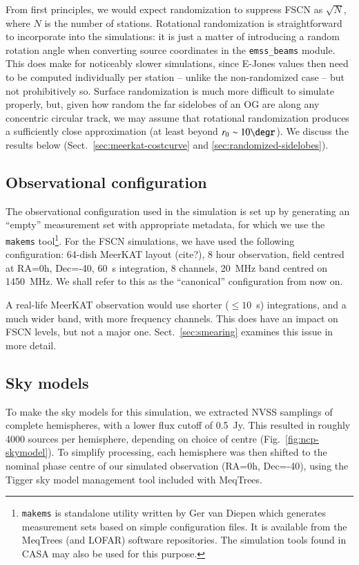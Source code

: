 \documentclass{aa}
\begin{document}
From first principles, we would expect randomization to suppress FSCN as $\sqrt{N}$, where $N$ is the number of stations. Rotational randomization is straightforward to incorporate into the simulations: it is just a matter of introducing a random rotation angle when converting source coordinates in the {\tt emss\_beams} module. This does make for noticeably slower simulations, since E-Jones values then need to be computed individually per station -- unlike the non-randomized case -- but not prohibitively so. Surface randomization is much more difficult to simulate properly, but, given how random the far sidelobes of an OG are along any concentric circular track, we may assume that rotational randomization produces a sufficiently close approximation (at least beyond $r_0\sim10\degr$). We discuss the results below (Sect.~\ref{sec:meerkat-costcurve} and \ref{sec:randomized-sidelobes}).

\subsection{Observational configuration}
\label{sec:config}

The observational configuration used in the simulation is set up by generating an ``empty'' measurement set with appropriate metadata, for which we use the {\tt makems} tool\footnote{{\tt makems} is standalone utility written by Ger van Diepen which generates measurement sets based on simple configuration files. It is available from the MeqTrees (and LOFAR) software repositories. The simulation tools found in CASA may also be used for this purpose.}. For the FSCN simulations, we have used the following configuration: 64-dish MeerKAT layout (cite?), 8 hour observation, field centred at RA=0h, Dec=-40\degr, 60~s integration, 8 channels, 20~MHz band centred on 1450~MHz. We shall refer to this as the ``canonical'' configuration from now on.

A real-life MeerKAT observation would use shorter ($\leq10$~s) integrations, and a much wider band, with more frequency channels. This does have an impact on FSCN levels, but not a major one. Sect.~\ref{sec:smearing} examines this issue in more detail.

\subsection{Sky models}

To make the sky models for this simulation, we extracted NVSS samplings of complete hemispheres, with a lower flux cutoff of 0.5~Jy. This resulted in roughly 4000 sources per hemisphere, depending on choice of centre (Fig.~\ref{fig:ncp-skymodel}). To simplify processing, each hemisphere was then shifted to the nominal phase centre of our simulated observation (RA=0h, Dec=-40\degr), using the Tigger sky model management tool included with MeqTrees.
\end{document}
